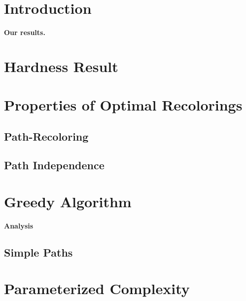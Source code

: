 

\section{Introduction}

	
\paragraph*{\bf Our results.}


\section{Hardness Result}



\section{Properties of Optimal Recolorings}

	
	\subsection{Path-Recoloring}
	
	
	\subsection{Path Independence}
	


\section{Greedy Algorithm}




\paragraph*{\bf Analysis}


	\subsection{Simple Paths}
	

\section{Parameterized Complexity}

